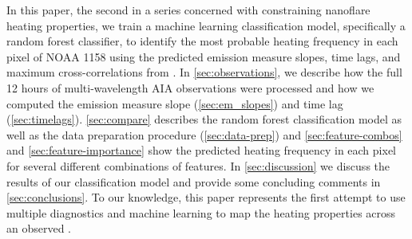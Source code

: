 In this paper, the second in a series concerned with constraining nanoflare heating properties, we train a machine learning classification model, specifically a random forest classifier, to identify the most probable heating frequency in each pixel of \AR{} NOAA 1158 using the predicted emission measure slopes, time lags, and maximum cross-correlations from .
In \autoref{sec:observations}, we describe how the full 12 hours of multi-wavelength AIA observations were processed and how we computed the emission measure slope (\autoref{sec:em_slopes}) and time lag (\autoref{sec:timelags}).
\autoref{sec:compare} describes the random forest classification model as well as the data preparation procedure (\autoref{sec:data-prep}) and \autoref{sec:feature-combos} and \ref{sec:feature-importance} show the predicted heating frequency in each pixel for several different combinations of features.
In \autoref{sec:discussion} we discuss the results of our classification model and provide some concluding comments in \autoref{sec:conclusions}.
To our knowledge, this paper represents the first attempt to use multiple diagnostics and machine learning to map the heating properties across an observed \AR{}.